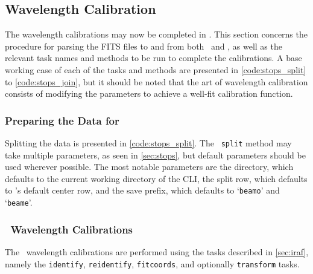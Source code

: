 \pagebreak

\subsection{Wavelength Calibration} \label{subsec:reduc_wav}

The wavelength calibrations may now be completed in \iraf. This section concerns the procedure for parsing the \gls{FITS} files to and from both \iraf\ and \polsalt, as well as the relevant task names and methods to be run to complete the calibrations. A base working case of each of the tasks and methods are presented in \autoref{code:stops_split} to \ref{code:stops_join}, but it should be noted that the art of wavelength calibration consists of modifying the parameters to achieve a well-fit calibration function.%

\subsubsection{Preparing the Data for \iraf}

Splitting the data is presented in \autoref{code:stops_split}. The \stops\ \texttt{split} method may take multiple parameters, as seen in \autoref{sec:stops}, but default parameters should be used wherever possible. The most notable parameters are the directory, which defaults to the current working directory of the \gls{CLI}, the split row, which defaults to \polsalt's default center row, and the save prefix, which defaults to `\texttt{beamo}' and `\texttt{beame}'.

\subsubsection{\iraf\ Wavelength Calibrations}

The \iraf\ wavelength calibrations are performed using the tasks described in \autoref{sec:iraf}, namely the \texttt{identify}, \texttt{reidentify}, \texttt{fitcoords}, and optionally \texttt{transform} tasks.

